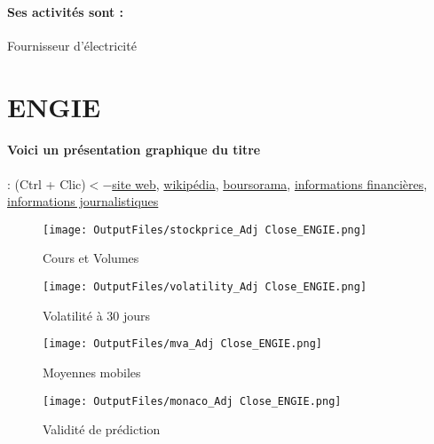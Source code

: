 \documentclass[11pt,a4paper]{report}%
\begin{document}
\paragraph{Ses activités sont : } Fournisseur d’électricité 
    
    \newpage

\section{ENGIE}

\paragraph{Voici un présentation graphique du titre} : (Ctrl + Clic)$<-$\href{https://www.engie.com/news/investisseurs}{site web}, \href{https://fr.wikipedia.org/wiki/Engie}{wikipédia}, \href{https://www.boursorama.com/cours/1rPENGI}{boursorama}, \href{https://www.qwant.com/?q=site:https:%2f%2fwww.easybourse.com%2faction-societe%2fENGIE&t=web&client=ext-firefox-hp}{informations financières}, \href{https://bourse.lerevenu.com/cours-de-bourse/fiche-valeur-synthese/ENGIE/ENGI-FR}{informations journalistiques}
\begin{figure}[!htb]
   \begin{minipage}{0.5\textwidth}
     \centering
     \texttt{[image: OutputFiles/stockprice\_Adj Close\_ENGIE.png]}
     \caption{Cours et Volumes}\label{Fig:price_ENGIE}
   \end{minipage}\hfill
   \begin{minipage}{0.5\textwidth}
     \centering
     \texttt{[image: OutputFiles/volatility\_Adj Close\_ENGIE.png]}
     \caption{Volatilité à 30 jours}\label{Fig:volat_ENGIE}
   \end{minipage}
\end{figure}
\begin{figure}[!htb]
   \begin{minipage}{0.5\textwidth}
     \centering
     \texttt{[image: OutputFiles/mva\_Adj Close\_ENGIE.png]}
     \caption{Moyennes mobiles}\label{Fig:mva_ENGIE}
   \end{minipage}\hfill
   \begin{minipage}{0.5\textwidth}
     \centering
     \texttt{[image: OutputFiles/monaco\_Adj Close\_ENGIE.png]}
     \caption{Validité de prédiction}\label{Fig:prediction_ENGIE}
   \end{minipage}
\end{figure}
\end{document}
